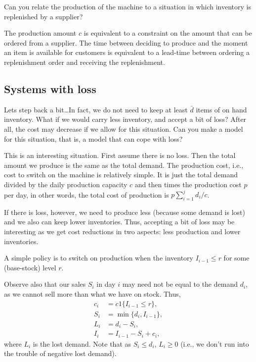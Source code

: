 \begin{question}
  Can you relate the production of the machine to a situation in which
  inventory is replenished by a supplier?
  \begin{solution}
    The production amount $c$ is equivalent to a constraint on the
    amount that can be ordered from a supplier. The time between
    deciding to produce and the moment an item is available for
    customers is equivalent to a lead-time between ordering a
    replenishment order and receiving the replenishment.
  \end{solution}
\end{question}

\subsection{Systems with loss}
\label{sec:real-that-prev}

\begin{question}
  Lets step back a bit\ldots In fact, we do not need to keep at least
  $\bar d$ items of on hand inventory. What if we would carry less
  inventory, and accept a bit of loss?  After all, the cost may
  decrease if we allow for this situation. Can you make a model for
  this situation, that is, a model that can cope with loss?
  \begin{solution}
    This is an interesting situation. First assume there is no
    loss. Then the total amount we produce is the same as the total
    demand. The production cost, i.e., cost to switch on the machine
    is relatively simple. It is just the total demand divided by the
    daily production capacity $c$ and then times the production cost
    $p$ per day, in other words, the total cost of production is
    $p\sum_{i=1}^j d_i/c$.

    If there is loss, however, we need to produce less (because some
    demand is lost) and we also can keep lower inventories. Thus,
    accepting a bit of loss may be interesting as we get cost
    reductions in two aspects: less production and lower inventories.

    A simple policy is to switch on production when the inventory
    $I_{i-1}\leq r$ for some (base-stock) level $r$. 

Observe also that our sales $S_i$ in day $i$ may need not be equal to the demand $d_i$,  as we cannot sell more than what we have on stock. Thus,
    \begin{align*}
      c_i &= c 1\{I_{i-1} \leq r\}, \\
      S_i &= \min\{d_i, I_{i-1}\}, \\
      L_i &= d_i - S_i, \\
      I_i &= I_{i-1} -S_i + c_i, 
    \end{align*}
    where $L_i$ is the lost demand. Note that as $S_i \leq d_i$,
    $L_i \geq 0$ (i.e., we don't run into the trouble of negative lost
    demand).
  \end{solution}
\end{question}

